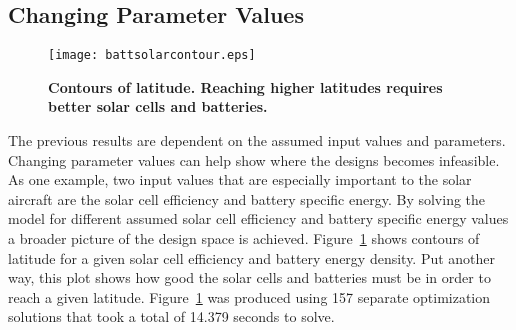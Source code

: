 % 

\newpage
\subsection{Changing Parameter Values}

\begin{figure}[h!]
	\begin{center}
	\texttt{[image: battsolarcontour.eps]}
    \caption{\textbf{Contours of latitude. Reaching higher latitudes requires better solar cells and batteries.}}
	\label{f:battsolarcontour}
	\end{center}
\end{figure}

The previous results are dependent on the assumed input values and parameters.
Changing parameter values can help show where the designs becomes infeasible. 
As one example, two input values that are especially important to the solar aircraft are the solar cell efficiency and battery specific energy. 
By solving the model for different assumed solar cell efficiency and battery specific energy values a broader picture of the design space is achieved.   
Figure~\ref{f:battsolarcontour} shows contours of latitude for a given solar cell efficiency and battery energy density.  
Put another way, this plot shows how good the solar cells and batteries must be in order to reach a given latitude. 
Figure~\ref{f:battsolarcontour} was produced using 157 separate optimization solutions that took a total of 14.379 seconds to solve. 



